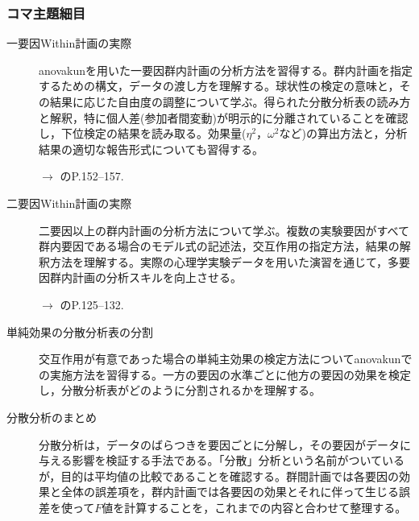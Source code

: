 \subsubsection{コマ主題細目}
\begin{description}
	\item[一要因Within計画の実際] anovakunを用いた一要因群内計画の分析方法を習得する。群内計画を指定するための構文，データの渡し方を理解する。球状性の検定の意味と，その結果に応じた自由度の調整について学ぶ。得られた分散分析表の読み方と解釈，特に個人差(参加者間変動)が明示的に分離されていることを確認し，下位検定の結果を読み取る。効果量($\eta^2$，$\omega^2$など)の算出方法と，分析結果の適切な報告形式についても習得する。
	      \begin{flushright}
		      $\to$ \textcite{kosugi2019}のP.152--157.
	      \end{flushright}

	\item[二要因Within計画の実際] 二要因以上の群内計画の分析方法について学ぶ。複数の実験要因がすべて群内要因である場合のモデル式の記述法，交互作用の指定方法，結果の解釈方法を理解する。実際の心理学実験データを用いた演習を通じて，多要因群内計画の分析スキルを向上させる。
	      \begin{flushright}
		      $\to$ \textcite{kosugi2018}のP.125--132.
	      \end{flushright}

	\item[単純効果の分散分析表の分割] 交互作用が有意であった場合の単純主効果の検定方法についてanovakunでの実施方法を習得する。一方の要因の水準ごとに他方の要因の効果を検定し，分散分析表がどのように分割されるかを理解する。

	\item[分散分析のまとめ] 分散分析は，データのばらつきを要因ごとに分解し，その要因がデータに与える影響を検証する手法である。「分散」分析という名前がついているが，目的は平均値の比較であることを確認する。群間計画では各要因の効果と全体の誤差項を，群内計画では各要因の効果とそれに伴って生じる誤差を使って$F$値を計算することを，これまでの内容と合わせて整理する。


\end{description}
